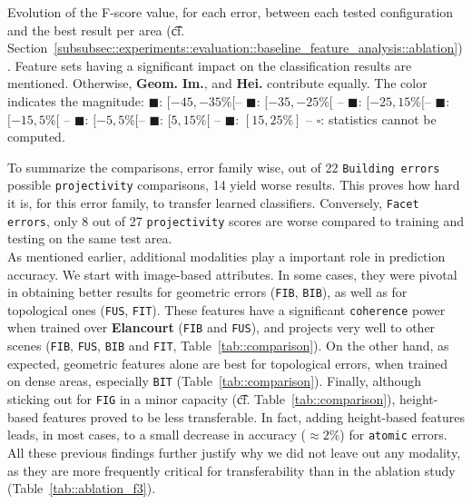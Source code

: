 \begin{table}[htbp]
            \caption{
                \label{tab::comparison} Evolution of the F-score value, for each error, between each tested configuration and the best result per area (\t{cf.} Section~\ref{subsubsec::experiments::evaluation::baseline_feature_analysis::ablation}).
                Feature sets having a significant impact on the classification results are mentioned.
                Otherwise, \textbf{Geom.} \textbf{Im.}, and \textbf{Hei.} contribute equally.
                The color indicates the magnitude: \textcolor{LOSS3545}{$\blacksquare$}: $[-45,-35\%[$-- \textcolor{LOSS2535}{$\blacksquare$}: $[-35,-25\%[$ -- \textcolor{LOSS1525}{$\blacksquare$}: $[-25,15\%[$-- \textcolor{LOSS0515}{$\blacksquare$}: $[-15, 5\%[$ -- \textcolor{STBL}{$\blacksquare$}: $[-5,5\%[$-- \textcolor{GAIN0515}{$\blacksquare$}: $[5,15\%[$ -- \textcolor{GAIN15}{$\blacksquare$}: $[15,25\%]$ -- $\square$: statistics cannot be computed.
            }
        \end{table}


        To summarize the comparisons, error family wise, out of 22 \texttt{Building errors} possible \texttt{projectivity} comparisons, 14 yield worse results.
        This proves how hard it is, for this error family, to transfer learned classifiers.
        Conversely, \texttt{Facet errors}, only 8 out of 27 \texttt{projectivity} scores are worse compared to training and testing on the same test area.\\

        As mentioned earlier, additional modalities play a important role in prediction accuracy.
        We start with image-based attributes.
        In some cases, they were pivotal in obtaining better results for geometric errors (\texttt{FIB}, \texttt{BIB}), as well as for topological ones (\texttt{FUS}, \texttt{FIT}).
        These features have a significant \texttt{coherence} power when trained over \textbf{Elancourt} (\texttt{FIB} and \texttt{FUS}), and projects very well to other scenes (\texttt{FIB}, \texttt{FUS}, \texttt{BIB} and \texttt{FIT}, Table~\ref{tab::comparison}).
        On the other hand, as expected, geometric features alone are best for topological errors, when trained on dense areas, especially \texttt{BIT} (Table~\ref{tab::comparison}).
        Finally, although sticking out for \texttt{FIG} in a minor capacity (\t{cf.} Table~\ref{tab::comparison}), height-based features proved to be less transferable.
        In fact, adding height-based features leads, in most cases, to a small decrease in accuracy ($\approx 2\%$) for \texttt{atomic} errors.
        All these previous findings further justify why we did not leave out any modality, as they are more frequently critical for transferability than in the ablation study (Table~\ref{tab::ablation_f3}).\\

